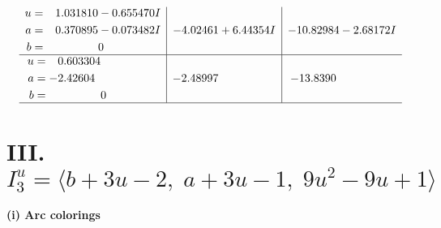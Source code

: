 \documentclass[1p]{elsarticle_modified}
\theoremstyle{definition}
\begin{document}
$$\begin{array}{c|c|c}
\begin{aligned}
u &= \phantom{-}1.031810 - 0.655470 I \\
a &= \phantom{-}0.370895 - 0.073482 I \\
b &= \phantom{-0.000000 } 0\end{aligned}
 & -4.02461 + 6.44354 I & -10.82984 - 2.68172 I \\ \hline\begin{aligned}
u &= \phantom{-}0.603304\phantom{ +0.000000I} \\
a &= -2.42604\phantom{ +0.000000I} \\
b &= \phantom{-0.000000 } 0\end{aligned}
 & -2.48997\phantom{ +0.000000I} & -13.8390\phantom{ +0.000000I}\\
 \hline 
 \end{array}$$\newpage\newpage\renewcommand{\arraystretch}{1}
\centering \section*{III. $I^u_{3}= \langle b+3 u-2,\;a+3 u-1,\;9 u^2-9 u+1 \rangle$}
\flushleft \textbf{(i) Arc colorings}\\
\end{document}
